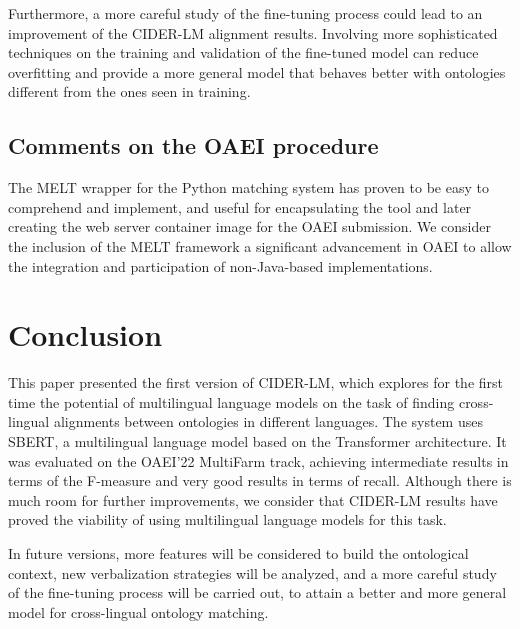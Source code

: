 \documentclass[
]{ceurart}
\begin{document}
Furthermore, a more careful study of the fine-tuning process could lead to an improvement of the CIDER-LM alignment results. Involving more sophisticated techniques on the training and validation of the fine-tuned model can reduce overfitting and provide a more general model that behaves better with ontologies different from the ones seen in training.


\subsection{Comments on the OAEI procedure}

The MELT wrapper for the Python matching system has proven to be easy to comprehend and implement, and useful for encapsulating the tool and later creating the web server container image for the OAEI submission. We consider the inclusion of the MELT framework a significant advancement in OAEI to allow the integration and participation of non-Java-based implementations.

\section{Conclusion}

This paper presented the first version of CIDER-LM, which explores for the first time the potential of multilingual language models on the task of finding cross-lingual alignments between ontologies in different languages. %
The system uses SBERT, a multilingual language model based on the Transformer architecture. It was evaluated on the OAEI'22 MultiFarm track, achieving intermediate results in terms of the F-measure and very good results in terms of recall. Although there is much room for further improvements, we consider that CIDER-LM results have proved the viability of using multilingual language models for this task. 

In future versions, more features will be considered to build the ontological context, new verbalization strategies will be analyzed, and a more careful study of the fine-tuning process will be carried out, to attain a better and more general model for cross-lingual ontology matching.
\end{document}
